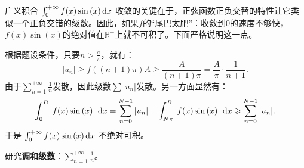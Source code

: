 \documentclass[12pt,UTF8,fontset=none]{ctexbook}
\begin{document}
\begin{so}
    广义积合 $\int_0^{+\infty} f(x) \sin{(x)} \,\mathrm{d}x$ 收敛的关键在于，正弦函数正负交替的特性让它类似一个正负交错的级数。因此，如果$f$的“尾巴太肥”：收敛到$0$的速度不够快，$f(x) \sin{(x)}$的绝对值在$\mathbb{R}^+$上就不可积了。下面严格说明这一点。
    
    根据题设条件，只要$\displaystyle n > \frac{a}{\pi}$，就有：
    $$ | u_n | \geqslant f((n+1)\pi)A \geqslant \frac{A}{(n+1)\pi} = \frac{A}{\pi} \cdot \frac{1}{n+1}. $$
    由于$\displaystyle \sum_{n=1}^{+\infty} \frac{1}{n}$发散，因此级数$\sum |u_n|$发散。另一方面显然有：
    $$ \int_0^{B} \left|f(x) \sin{(x)}\right| \,\mathrm{d}x = \sum_{n=0}^{N-1} |u_n| + \int_{N\pi}^{B} \left| f(x) \sin{(x)} \right| \,\mathrm{d}x \geqslant \sum_{n=0}^{N-1} |u_n|. $$
    于是 $\int_0^{+\infty} f(x) \sin{(x)} \,\mathrm{d}x$ 不绝对可积。 

\end{so}

\begin{et} 
    研究\textbf{调和级数}：$\displaystyle\sum_{n=1}^{+\infty} \frac{1}{n}$。
\end{et}
\end{document}
